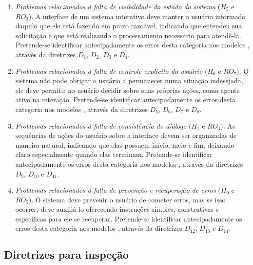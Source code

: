 \begin{enumerate}
  \renewcommand{\labelenumi}{$C_{\arabic{enumi}}$}

  \item {\em Problemas relacionados  à falta de visibilidade do estado
    do sistema} ($H_5$ e $RO_3$). A interface de um sistema interativo
    deve manter  o usuário informado  daquilo que ele está  fazendo em
    prazo razoável, indicando que  entendeu sua solicitação e que está
    realizando o processamento necessário para atendê-la.  Pretende-se
    identificar antecipadamente  os erros desta  categoria nos modelos
    \aladim,  através  da   diretrizes  $D_{1}$,  $D_{2}$,  $D_{3}$  e
    $D_{4}$.

  \item {\em  Problemas relacionados à falta de  controle explícito do
    usuário} ($H_6$ e $RO_7$). O  sistema não pode obrigar o usuário a
    permanecer numa situação indesejada,  ele deve permitir ao usuário
    decidir sobre suas próprias ações, como agente ativo na interação.
    Pretende-se identificar  antecipadamente os erros  desta categoria
    nos  modelos  \aladim,  através  da diretrizes  $D_{5}$,  $D_{6}$,
    $D_{7}$ e $D_{8}$.

  \item  {\em  Problemas  relacionados  à  falta  de  consistência  do
    diálogo} ($H_1$ e $RO_4$). As sequências de ações do usuário sobre
    a interface  devem ser  organizadas de maneira  natural, indicando
    que elas possuem início,  meio e fim, deixando claro especialmente
    quando elas terminam.   Pretende-se identificar antecipadamente os
    erros desta  categoria nos modelos \aladim,  através da diretrizes
    $D_{9}$, $D_{10}$ e $D_{11}$.

  \item {\em Problemas relacionados à falta de prevenção e recuperação
    de erros} ($H_9$  e $RO_5$). O sistema deve  prevenir o usuário de
    cometer  erros, mas  se isso  ocorrer, deve  auxiliá-lo oferecendo
    instruções  simples,  construtivas   e  específicas  para  ele  se
    recuperar.  Pretende-se identificar antecipadamente os erros desta
    categoria  nos modelos  \aladim, através  da  diretrizes $D_{12}$,
    $D_{13}$ e $D_{14}$.

\end{enumerate}

\subsection{Diretrizes para inspeção}
\label{inspectionGuidelines}


